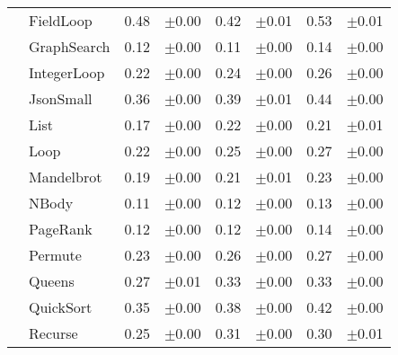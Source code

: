 \begin{tabular}{llrlrlrl}
 & FieldLoop & 0.48 & \scriptsize\textcolor{gray!60}{$\pm$0.00} & 0.42 & \scriptsize\textcolor{gray!60}{$\pm$0.01} & 0.53 & \scriptsize\textcolor{gray!60}{$\pm$0.01} \\
 & GraphSearch & 0.12 & \scriptsize\textcolor{gray!60}{$\pm$0.00} & 0.11 & \scriptsize\textcolor{gray!60}{$\pm$0.00} & 0.14 & \scriptsize\textcolor{gray!60}{$\pm$0.00} \\
 & IntegerLoop & 0.22 & \scriptsize\textcolor{gray!60}{$\pm$0.00} & 0.24 & \scriptsize\textcolor{gray!60}{$\pm$0.00} & 0.26 & \scriptsize\textcolor{gray!60}{$\pm$0.00} \\
 & JsonSmall & 0.36 & \scriptsize\textcolor{gray!60}{$\pm$0.00} & 0.39 & \scriptsize\textcolor{gray!60}{$\pm$0.01} & 0.44 & \scriptsize\textcolor{gray!60}{$\pm$0.00} \\
 & List & 0.17 & \scriptsize\textcolor{gray!60}{$\pm$0.00} & 0.22 & \scriptsize\textcolor{gray!60}{$\pm$0.00} & 0.21 & \scriptsize\textcolor{gray!60}{$\pm$0.01} \\
 & Loop & 0.22 & \scriptsize\textcolor{gray!60}{$\pm$0.00} & 0.25 & \scriptsize\textcolor{gray!60}{$\pm$0.00} & 0.27 & \scriptsize\textcolor{gray!60}{$\pm$0.00} \\
 & Mandelbrot & 0.19 & \scriptsize\textcolor{gray!60}{$\pm$0.00} & 0.21 & \scriptsize\textcolor{gray!60}{$\pm$0.01} & 0.23 & \scriptsize\textcolor{gray!60}{$\pm$0.00} \\
 & NBody & 0.11 & \scriptsize\textcolor{gray!60}{$\pm$0.00} & 0.12 & \scriptsize\textcolor{gray!60}{$\pm$0.00} & 0.13 & \scriptsize\textcolor{gray!60}{$\pm$0.00} \\
 & PageRank & 0.12 & \scriptsize\textcolor{gray!60}{$\pm$0.00} & 0.12 & \scriptsize\textcolor{gray!60}{$\pm$0.00} & 0.14 & \scriptsize\textcolor{gray!60}{$\pm$0.00} \\
 & Permute & 0.23 & \scriptsize\textcolor{gray!60}{$\pm$0.00} & 0.26 & \scriptsize\textcolor{gray!60}{$\pm$0.00} & 0.27 & \scriptsize\textcolor{gray!60}{$\pm$0.00} \\
 & Queens & 0.27 & \scriptsize\textcolor{gray!60}{$\pm$0.01} & 0.33 & \scriptsize\textcolor{gray!60}{$\pm$0.00} & 0.33 & \scriptsize\textcolor{gray!60}{$\pm$0.00} \\
 & QuickSort & 0.35 & \scriptsize\textcolor{gray!60}{$\pm$0.00} & 0.38 & \scriptsize\textcolor{gray!60}{$\pm$0.00} & 0.42 & \scriptsize\textcolor{gray!60}{$\pm$0.00} \\
 & Recurse & 0.25 & \scriptsize\textcolor{gray!60}{$\pm$0.00} & 0.31 & \scriptsize\textcolor{gray!60}{$\pm$0.00} & 0.30 & \scriptsize\textcolor{gray!60}{$\pm$0.01} \\

\end{tabular}
